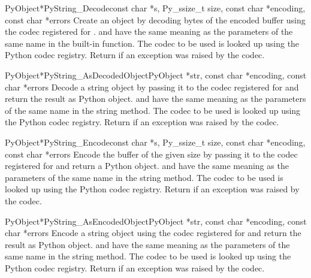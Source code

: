 \begin{cfuncdesc}{PyObject*}{PyString_Decode}{const char *s,
                                               Py_ssize_t size,
                                               const char *encoding,
                                               const char *errors}
  Create an object by decoding  bytes of the encoded
  buffer  using the codec registered for
  .   and  have the same
  meaning as the parameters of the same name in the
   built-in function.  The codec to be used is
  looked up using the Python codec registry.  Return \NULL{} if
  an exception was raised by the codec.
\end{cfuncdesc}

\begin{cfuncdesc}{PyObject*}{PyString_AsDecodedObject}{PyObject *str,
                                               const char *encoding,
                                               const char *errors}
  Decode a string object by passing it to the codec registered for
   and return the result as Python
  object.  and  have the same meaning as the
  parameters of the same name in the string  method.
  The codec to be used is looked up using the Python codec registry.
  Return \NULL{} if an exception was raised by the codec.
\end{cfuncdesc}

\begin{cfuncdesc}{PyObject*}{PyString_Encode}{const char *s,
                                               Py_ssize_t size,
                                               const char *encoding,
                                               const char *errors}
  Encode the  buffer of the given size by passing it to
  the codec registered for  and return a Python object.
   and  have the same meaning as the
  parameters of the same name in the string  method.
  The codec to be used is looked up using the Python codec
  registry.  Return \NULL{} if an exception was raised by the
  codec.
\end{cfuncdesc}

\begin{cfuncdesc}{PyObject*}{PyString_AsEncodedObject}{PyObject *str,
                                               const char *encoding,
                                               const char *errors}
  Encode a string object using the codec registered for
   and return the result as Python object.
   and  have the same meaning as the
  parameters of the same name in the string  method.
  The codec to be used is looked up using the Python codec registry.
  Return \NULL{} if an exception was raised by the codec.
\end{cfuncdesc}


